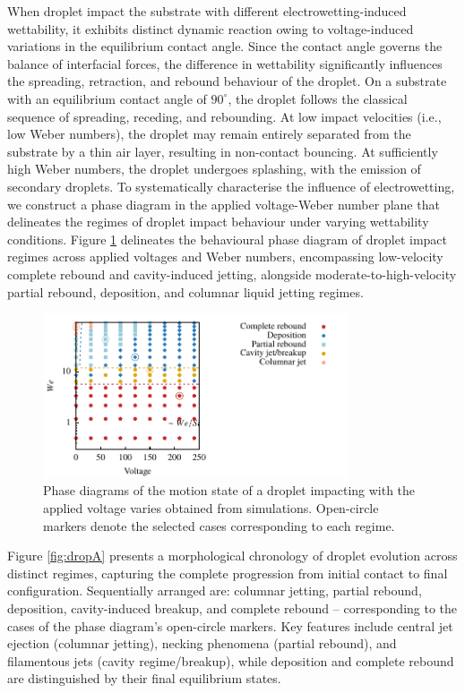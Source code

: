 \documentclass[lineno]{cls/jfm}
\begin{document}
When droplet impact the substrate with different electrowetting-induced wettability, it exhibits distinct dynamic reaction owing to voltage-induced variations in the equilibrium contact angle. Since the contact angle governs the balance of interfacial forces, the difference in wettability significantly influences the spreading, retraction, and rebound behaviour of the droplet. On a substrate with an equilibrium contact angle of $90^\circ$, the droplet follows the classical sequence of spreading, receding, and rebounding. At low impact velocities (i.e., low Weber numbers), the droplet may remain entirely separated from the substrate by a thin air layer, resulting in non-contact bouncing. At sufficiently high Weber numbers, the droplet undergoes splashing, with the emission of secondary droplets. To systematically characterise the influence of electrowetting, we construct a phase diagram in the applied voltage-Weber number plane that delineates the regimes of droplet impact behaviour under varying wettability conditions. Figure \ref{fig:phase} delineates the behavioural phase diagram of droplet impact regimes across applied voltages and Weber numbers, encompassing low-velocity complete rebound and cavity-induced jetting, alongside moderate-to-high-velocity partial rebound, deposition, and columnar liquid jetting regimes.

 \begin{figure}
  \centerline{\includegraphics[width=0.8\textwidth]{fig/phase.pdf}}
  \caption{Phase diagrams of the motion state of a droplet impacting with the applied voltage varies obtained from simulations. Open-circle markers denote the selected cases corresponding to each regime.}
 \label{fig:phase}
 \end{figure}

 Figure \ref{fig:dropA} presents a morphological chronology of droplet evolution across distinct regimes, capturing the complete progression from initial contact to final configuration. Sequentially arranged are: columnar jetting, partial rebound, deposition, cavity-induced breakup, and complete rebound -- corresponding to the cases of the phase diagram's open-circle markers. Key features include central jet ejection (columnar jetting), necking phenomena (partial rebound), and filamentous jets (cavity regime/breakup), while deposition and complete rebound are distinguished by their final equilibrium states.
\end{document}

